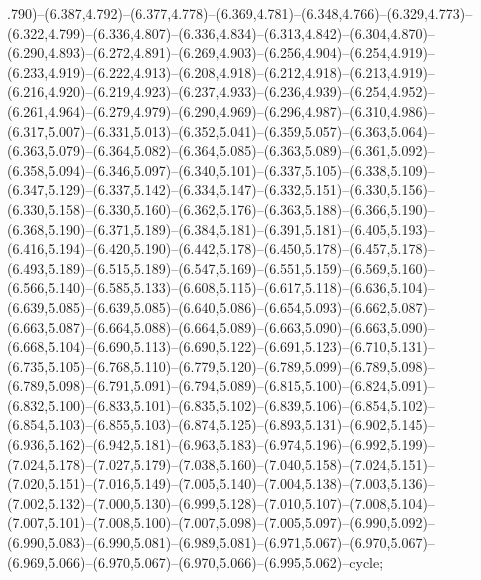 .790)--(6.387,4.792)--(6.377,4.778)--(6.369,4.781)--(6.348,4.766)--(6.329,4.773)--(6.322,4.799)--(6.336,4.807)--(6.336,4.834)--(6.313,4.842)--(6.304,4.870)--(6.290,4.893)--(6.272,4.891)--(6.269,4.903)--(6.256,4.904)--(6.254,4.919)--(6.233,4.919)--(6.222,4.913)--(6.208,4.918)--(6.212,4.918)--(6.213,4.919)--(6.216,4.920)--(6.219,4.923)--(6.237,4.933)--(6.236,4.939)--(6.254,4.952)--(6.261,4.964)--(6.279,4.979)--(6.290,4.969)--(6.296,4.987)--(6.310,4.986)--(6.317,5.007)--(6.331,5.013)--(6.352,5.041)--(6.359,5.057)--(6.363,5.064)--(6.363,5.079)--(6.364,5.082)--(6.364,5.085)--(6.363,5.089)--(6.361,5.092)--(6.358,5.094)--(6.346,5.097)--(6.340,5.101)--(6.337,5.105)--(6.338,5.109)--(6.347,5.129)--(6.337,5.142)--(6.334,5.147)--(6.332,5.151)--(6.330,5.156)--(6.330,5.158)--(6.330,5.160)--(6.362,5.176)--(6.363,5.188)--(6.366,5.190)--(6.368,5.190)--(6.371,5.189)--(6.384,5.181)--(6.391,5.181)--(6.405,5.193)--(6.416,5.194)--(6.420,5.190)--(6.442,5.178)--(6.450,5.178)--(6.457,5.178)--(6.493,5.189)--(6.515,5.189)--(6.547,5.169)--(6.551,5.159)--(6.569,5.160)--(6.566,5.140)--(6.585,5.133)--(6.608,5.115)--(6.617,5.118)--(6.636,5.104)--(6.639,5.085)--(6.639,5.085)--(6.640,5.086)--(6.654,5.093)--(6.662,5.087)--(6.663,5.087)--(6.664,5.088)--(6.664,5.089)--(6.663,5.090)--(6.663,5.090)--(6.668,5.104)--(6.690,5.113)--(6.690,5.122)--(6.691,5.123)--(6.710,5.131)--(6.735,5.105)--(6.768,5.110)--(6.779,5.120)--(6.789,5.099)--(6.789,5.098)--(6.789,5.098)--(6.791,5.091)--(6.794,5.089)--(6.815,5.100)--(6.824,5.091)--(6.832,5.100)--(6.833,5.101)--(6.835,5.102)--(6.839,5.106)--(6.854,5.102)--(6.854,5.103)--(6.855,5.103)--(6.874,5.125)--(6.893,5.131)--(6.902,5.145)--(6.936,5.162)--(6.942,5.181)--(6.963,5.183)--(6.974,5.196)--(6.992,5.199)--(7.024,5.178)--(7.027,5.179)--(7.038,5.160)--(7.040,5.158)--(7.024,5.151)--(7.020,5.151)--(7.016,5.149)--(7.005,5.140)--(7.004,5.138)--(7.003,5.136)--(7.002,5.132)--(7.000,5.130)--(6.999,5.128)--(7.010,5.107)--(7.008,5.104)--(7.007,5.101)--(7.008,5.100)--(7.007,5.098)--(7.005,5.097)--(6.990,5.092)--(6.990,5.083)--(6.990,5.081)--(6.989,5.081)--(6.971,5.067)--(6.970,5.067)--(6.969,5.066)--(6.970,5.067)--(6.970,5.066)--(6.995,5.062)--cycle;
